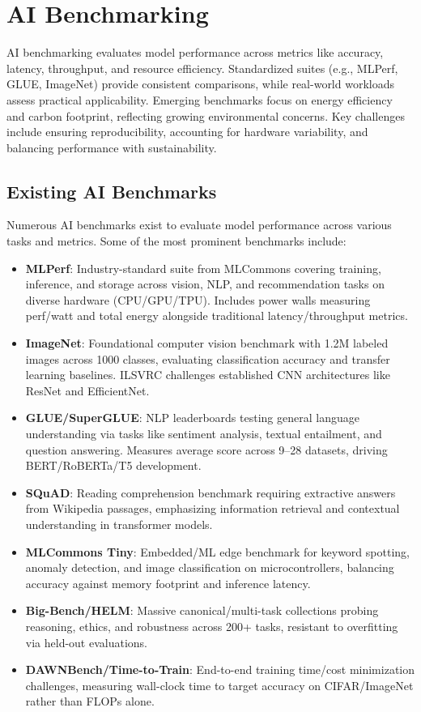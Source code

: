 \section{AI Benchmarking}
AI benchmarking evaluates model performance across metrics like accuracy, latency, throughput, and resource efficiency. Standardized suites (e.g., MLPerf, GLUE, ImageNet) provide consistent comparisons, while real-world workloads assess practical applicability. Emerging benchmarks focus on energy efficiency and carbon footprint, reflecting growing environmental concerns. Key challenges include ensuring reproducibility, accounting for hardware variability, and balancing performance with sustainability.

\subsection{Existing AI Benchmarks}
Numerous AI benchmarks exist to evaluate model performance across various tasks and metrics. Some of the most prominent benchmarks include:
\begin{itemize}
    \item \textbf{MLPerf}: Industry-standard suite from MLCommons covering training, inference, and storage across vision, NLP, and recommendation tasks on diverse hardware (CPU/GPU/TPU). Includes power walls measuring perf/watt and total energy alongside traditional latency/throughput metrics.
    
    \item \textbf{ImageNet}: Foundational computer vision benchmark with 1.2M labeled images across 1000 classes, evaluating classification accuracy and transfer learning baselines. ILSVRC challenges established CNN architectures like ResNet and EfficientNet.
    
    \item \textbf{GLUE/SuperGLUE}: NLP leaderboards testing general language understanding via tasks like sentiment analysis, textual entailment, and question answering. Measures average score across 9--28 datasets, driving BERT/RoBERTa/T5 development.
    
    \item \textbf{SQuAD}: Reading comprehension benchmark requiring extractive answers from Wikipedia passages, emphasizing information retrieval and contextual understanding in transformer models.
    
    \item \textbf{MLCommons Tiny}: Embedded/ML edge benchmark for keyword spotting, anomaly detection, and image classification on microcontrollers, balancing accuracy against memory footprint and inference latency.
    
    \item \textbf{Big-Bench/HELM}: Massive canonical/multi-task collections probing reasoning, ethics, and robustness across 200+ tasks, resistant to overfitting via held-out evaluations.
    
    \item \textbf{DAWNBench/Time-to-Train}: End-to-end training time/cost minimization challenges, measuring wall-clock time to target accuracy on CIFAR/ImageNet rather than FLOPs alone.
\end{itemize}

